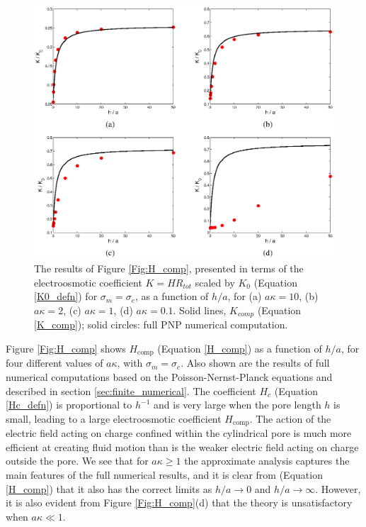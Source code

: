 \begin{figure}[ht]
\includegraphics[width=\textwidth]{finite_thickness/finite_pore_pic7.eps}
\caption{The results of Figure \ref{Fig:H_comp}, presented in terms of the electroosmotic coefficient $K=HR_{tot}$ scaled by $K_0$ (Equation \ref{K0_defn}) for $\sigma_m=\sigma_c$, as a function of $h/a$, for (a) $a\kappa=10$, (b) $a\kappa=2$, (c) $a\kappa=1$, (d) $a\kappa=0.1$. Solid lines, $K_{comp}$ (Equation \ref{K_comp}); solid circles: full PNP numerical computation.}
\label{Fig:K_comp}
\end{figure}

Figure \ref{Fig:H_comp} shows $H_\text{comp}$ (Equation \ref{H_comp}) as a function of $h/a$, for four
different values of $a\kappa$, with $\sigma_m=\sigma_c$. Also shown are the results of full numerical
computations based on the
Poisson-Nernst-Planck equations \cite{mao2014}
and described in section \ref{sec:finite_numerical}. 
The coefficient $H_c$ (Equation \ref{Hc_defn})
is proportional to $h^{-1}$ and is very large when the
pore length $h$ is small, leading to a large electroosmotic coefficient
$H_\text{comp}$. The action of the electric field
acting on charge confined within the cylindrical pore
is much more efficient at creating fluid motion than is the
weaker electric field acting on charge outside the pore.
We see that for $a\kappa\ge 1$ the
approximate analysis captures the main features of the full numerical
results, and it is clear from (Equation \ref{H_comp}) that it also has the
correct limits as $h/a\rightarrow 0$ and
$h/a\rightarrow\infty$. However,
it is also evident from Figure \ref{Fig:H_comp}(d)
that the theory is unsatisfactory when
$a\kappa\ll 1$.

